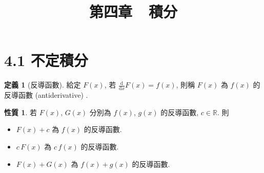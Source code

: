 \documentclass[12pt]{extarticle}
\newcommand{\ds}{\displaystyle}
\theoremstyle{definition}
\newtheorem*{dfn}{定義}
\newtheorem*{prp}{性質}
\begin{document}
\title{\texorpdfstring{\vspace{-16mm} 第四章\ \ 積分}{第四章\ \ 積分}} 
\author{\vspace{-5em}}
\date{\vspace{-5em}}
\maketitle
\thispagestyle{firststyle}

\section*{4.1 不定積分}

\begin{dfn}[反導函數]
  給定 $\ds F(x)$, 若 $\ds\frac{\text{d}}{\text{d}x} F(x) = f(x)$, 則稱 $F(x)$ 為 $f(x)$ 的反導函數 (antiderivative) .  
\end{dfn}

\begin{prp}若 $\ds F(x)$, $\ds G(x)$ 分別為 $f(x)$, $g(x)$ 的反導函數, $c\in\mathbb{R}$. 則
  \begin{itemize}\setlength{\itemsep}{0pt}
    \item $\ds F(x) + c$ 為 $f(x)$ 的反導函數. 
    \item $\ds c\,F(x)$ 為 $c\,f(x)$ 的反導函數. 
    \item $\ds F(x) + G(x)$ 為 $f(x) + g(x)$ 的反導函數. 
  \end{itemize}
\end{prp}
\end{document}
